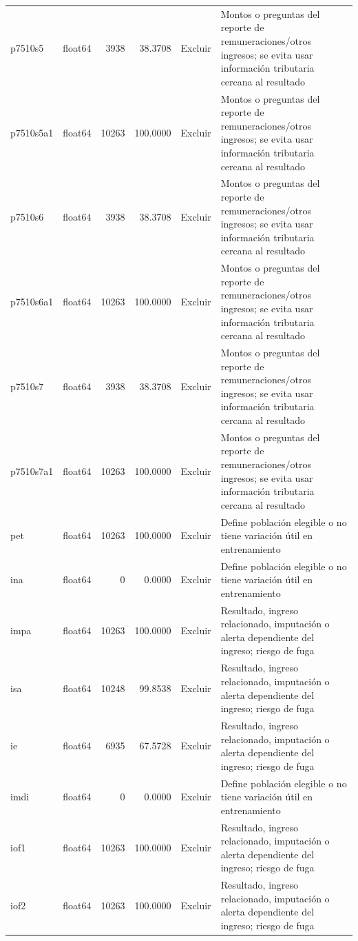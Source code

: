 \begin{longtable}{llrrll}
p7510s5 & float64 & 3938 & 38.3708 & Excluir & Montos o preguntas del reporte de remuneraciones/otros ingresos; se evita usar información tributaria cercana al resultado \\
p7510s5a1 & float64 & 10263 & 100.0000 & Excluir & Montos o preguntas del reporte de remuneraciones/otros ingresos; se evita usar información tributaria cercana al resultado \\
p7510s6 & float64 & 3938 & 38.3708 & Excluir & Montos o preguntas del reporte de remuneraciones/otros ingresos; se evita usar información tributaria cercana al resultado \\
p7510s6a1 & float64 & 10263 & 100.0000 & Excluir & Montos o preguntas del reporte de remuneraciones/otros ingresos; se evita usar información tributaria cercana al resultado \\
p7510s7 & float64 & 3938 & 38.3708 & Excluir & Montos o preguntas del reporte de remuneraciones/otros ingresos; se evita usar información tributaria cercana al resultado \\
p7510s7a1 & float64 & 10263 & 100.0000 & Excluir & Montos o preguntas del reporte de remuneraciones/otros ingresos; se evita usar información tributaria cercana al resultado \\
pet & float64 & 10263 & 100.0000 & Excluir & Define población elegible o no tiene variación útil en entrenamiento \\
ina & float64 & 0 & 0.0000 & Excluir & Define población elegible o no tiene variación útil en entrenamiento \\
impa & float64 & 10263 & 100.0000 & Excluir & Resultado, ingreso relacionado, imputación o alerta dependiente del ingreso; riesgo de fuga \\
isa & float64 & 10248 & 99.8538 & Excluir & Resultado, ingreso relacionado, imputación o alerta dependiente del ingreso; riesgo de fuga \\
ie & float64 & 6935 & 67.5728 & Excluir & Resultado, ingreso relacionado, imputación o alerta dependiente del ingreso; riesgo de fuga \\
imdi & float64 & 0 & 0.0000 & Excluir & Define población elegible o no tiene variación útil en entrenamiento \\
iof1 & float64 & 10263 & 100.0000 & Excluir & Resultado, ingreso relacionado, imputación o alerta dependiente del ingreso; riesgo de fuga \\
iof2 & float64 & 10263 & 100.0000 & Excluir & Resultado, ingreso relacionado, imputación o alerta dependiente del ingreso; riesgo de fuga \\

\end{longtable}
